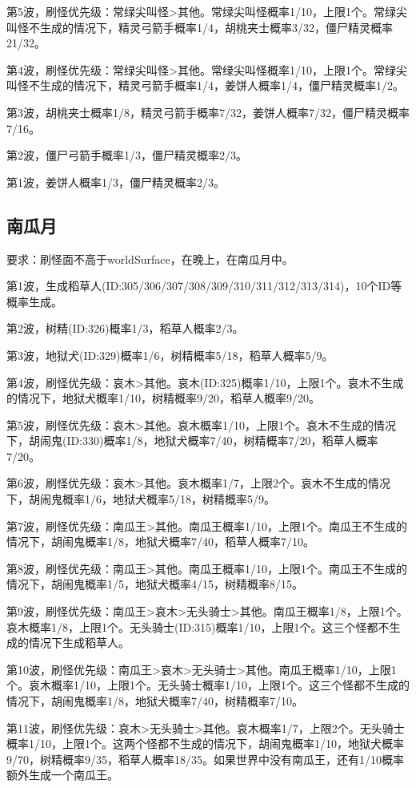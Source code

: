 第5波，刷怪优先级：常绿尖叫怪>其他。常绿尖叫怪概率1/10，上限1个。常绿尖叫怪不生成的情况下，精灵弓箭手概率1/4，胡桃夹士概率3/32，僵尸精灵概率21/32。

第4波，刷怪优先级：常绿尖叫怪>其他。常绿尖叫怪概率1/10，上限1个。常绿尖叫怪不生成的情况下，精灵弓箭手概率1/4，姜饼人概率1/4，僵尸精灵概率1/2。

第3波，胡桃夹士概率1/8，精灵弓箭手概率7/32，姜饼人概率7/32，僵尸精灵概率7/16。

第2波，僵尸弓箭手概率1/3，僵尸精灵概率2/3。

第1波，姜饼人概率1/3，僵尸精灵概率2/3。

\subsection{南瓜月}
要求：刷怪面不高于worldSurface，在晚上，在南瓜月中。

第1波，生成稻草人(ID:305/306/307/308/309/310/311/312/313/314)，10个ID等概率生成。

第2波，树精(ID:326)概率1/3，稻草人概率2/3。

第3波，地狱犬(ID:329)概率1/6，树精概率5/18，稻草人概率5/9。

第4波，刷怪优先级：哀木>其他。哀木(ID:325)概率1/10，上限1个。哀木不生成的情况下，地狱犬概率1/10，树精概率9/20，稻草人概率9/20。

第5波，刷怪优先级：哀木>其他。哀木概率1/10，上限1个。哀木不生成的情况下，胡闹鬼(ID:330)概率1/8，地狱犬概率7/40，树精概率7/20，稻草人概率7/20。

第6波，刷怪优先级：哀木>其他。哀木概率1/7，上限2个。哀木不生成的情况下，胡闹鬼概率1/6，地狱犬概率5/18，树精概率5/9。

第7波，刷怪优先级：南瓜王>其他。南瓜王概率1/10，上限1个。南瓜王不生成的情况下，胡闹鬼概率1/8，地狱犬概率7/40，稻草人概率7/10。

第8波，刷怪优先级：南瓜王>其他。南瓜王概率1/10，上限1个。南瓜王不生成的情况下，胡闹鬼概率1/5，地狱犬概率4/15，树精概率8/15。

第9波，刷怪优先级：南瓜王>哀木>无头骑士>其他。南瓜王概率1/8，上限1个。哀木概率1/8，上限1个。无头骑士(ID:315)概率1/10，上限1个。这三个怪都不生成的情况下生成稻草人。

第10波，刷怪优先级：南瓜王>哀木>无头骑士>其他。南瓜王概率1/10，上限1个。哀木概率1/10，上限1个。无头骑士概率1/10，上限1个。这三个怪都不生成的情况下，胡闹鬼概率1/8，地狱犬概率7/40，树精概率7/10。

第11波，刷怪优先级：哀木>无头骑士>其他。哀木概率1/7，上限2个。无头骑士概率1/10，上限1个。这两个怪都不生成的情况下，胡闹鬼概率1/10，地狱犬概率9/70，树精概率9/35，稻草人概率18/35。如果世界中没有南瓜王，还有1/10概率额外生成一个南瓜王。

